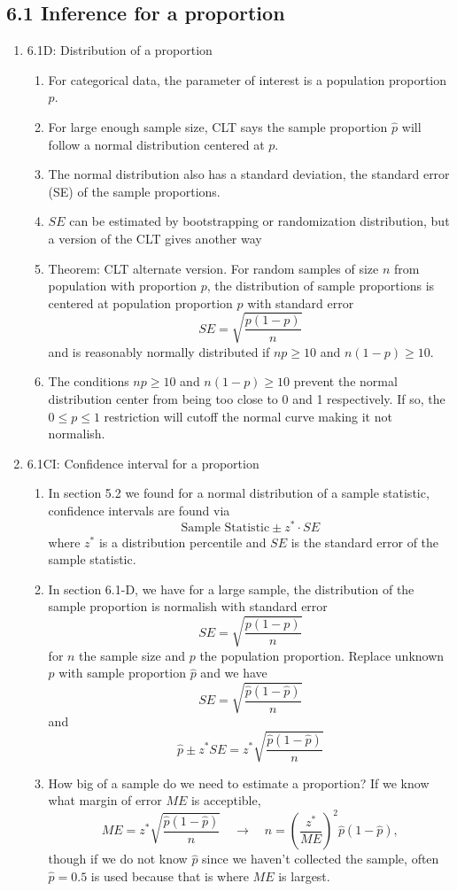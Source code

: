 \documentclass{article}
\begin{document}
\subsection{6.1 Inference for a proportion}
\begin{enumerate}

\item 6.1D: Distribution of a proportion
\begin{enumerate}
\item For categorical data, the parameter of interest is a population proportion $p$.
\item For large enough sample size, CLT says the sample proportion $\hat{p}$ will follow a normal distribution centered at $p$. 
\item The normal distribution also has a standard deviation, the standard error (SE) of the sample proportions.
\item $SE$ can be estimated by bootstrapping or randomization distribution, but a version of the CLT gives another way
\item Theorem: CLT alternate version. For random samples of size $n$ from population with proportion $p$, the distribution of sample proportions is centered at population proportion $p$ with standard error
\[
SE = \sqrt{\frac{p(1-p)}{n}}
\]
and is reasonably normally distributed if $np \geq 10$ and $n(1-p) \geq 10$.
\item The conditions  $np \geq 10$ and $n(1-p) \geq 10$ prevent the normal distribution center from being too close to 0 and 1 respectively. If so, the $0 \leq p \leq 1$ restriction will cutoff the normal curve making it not normalish.
\end{enumerate}

\item6.1CI: Confidence interval for a proportion
\begin{enumerate}
\item In section 5.2 we found for a normal distribution of a sample statistic, confidence intervals are found via
\[
\text{Sample Statistic} \pm z^* \cdot SE
\]
where $z^*$ is a distribution percentile and $SE$ is the standard error of the sample statistic.
\item In section 6.1-D, we have for a large sample, the distribution of the sample proportion is normalish with standard error
\[
SE = \sqrt{\frac{p(1-p)}{n}}
\]
for $n$ the sample size and $p$ the population proportion. Replace unknown $p$ with sample proportion $\hat{p}$ and we have
\[
SE = \sqrt{\frac{\hat{p}(1-\hat{p})}{n}}
\]
and 
\[
\hat{p} \pm  z^* SE = z^* \sqrt{\frac{\hat{p}(1-\hat{p})}{n}}
\]
\item How big of a sample do we need to estimate a proportion? If we know what margin of error $ME$ is acceptible, 
\[
ME = z^*\sqrt{\frac{\hat{p}(1-\hat{p})}{n}} \quad \rightarrow \quad n=\left(\frac{z^*}{ME}\right)^2 \hat{p}(1-\hat{p}),
\]
though if we do not know $\hat{p}$ since we haven't collected the sample, often $\hat{p} = 0.5$ is used because that is where $ME$ is largest.
\end{enumerate}


\end{enumerate}
\end{document}
